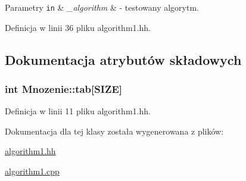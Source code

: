 \begin{DoxyParams}[1]{Parametry}
\mbox{\tt in}  & {\em \-\_\-algorithm} & -\/ testowany algorytm. \\
\hline
\end{DoxyParams}


Definicja w linii 36 pliku algorithm1.\-hh.



\subsection{Dokumentacja atrybutów składowych}
\hypertarget{class_mnozenie_a6dc67671f84a557d97c322b8af528359}{
\subsubsection[{tab}]{\setlength{\rightskip}{0pt plus 5cm}int Mnozenie\-::tab\mbox{[}{\bf S\-I\-Z\-E}\mbox{]}\hspace{0.3cm}{\ttfamily [private]}}}\label{class_mnozenie_a6dc67671f84a557d97c322b8af528359}


Definicja w linii 11 pliku algorithm1.\-hh.



Dokumentacja dla tej klasy została wygenerowana z plików\-:\begin{DoxyCompactItemize}
\item 
\hyperlink{algorithm1_8hh}{algorithm1.\-hh}\item 
\hyperlink{algorithm1_8cpp}{algorithm1.\-cpp}\end{DoxyCompactItemize}
